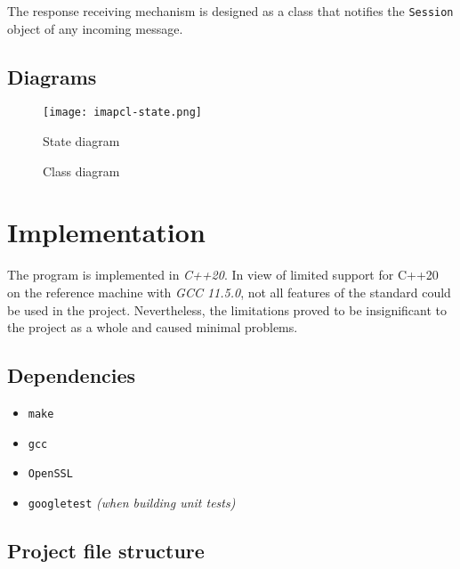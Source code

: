 \documentclass[a4]{report}
\begin{document}
The response receiving mechanism is designed as a class that notifies the \texttt{Session} object of any incoming message.

\section{Diagrams}

\begin{figure}
  \centering
  \texttt{[image: imapcl-state.png]}
  \caption{State diagram}
  \label{state}
\end{figure}

\begin{figure}[t]
  \centering
  \caption{Class diagram}
  \label{class}
\end{figure}


\chapter{Implementation}

The program is implemented in \textit{C++20}. In view of limited support for C++20 on the reference machine with \textit{GCC 11.5.0}, not all features of the standard could be used in the project. Nevertheless, the limitations proved to be insignificant to the project as a whole and caused minimal problems.

\section{Dependencies}

\begin{itemize}
\item \texttt{make}
\item \texttt{gcc}
\item \texttt{OpenSSL}
\item \texttt{googletest} \textit{(when building unit tests)}
\end{itemize}


\section{Project file structure}
\end{document}
